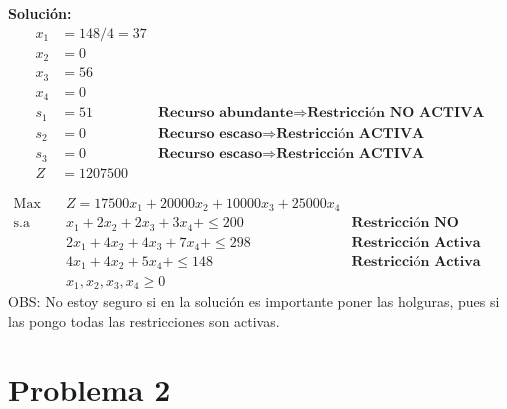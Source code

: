 \documentclass{templateNote}
\begin{document}
\begin{itemize}
    \textbf{Solución:}
    \begin{align*}
        x_1 &= 148/4 = 37 \\
        x_2 &= 0 \\
        x_3 &= 56 \\
        x_4 &= 0 \\
        s_1 &= 51 \qquad &\textbf{Recurso abundante} \Rightarrow \textbf{Restricci\'on NO ACTIVA} \\
        s_2 &= 0 \qquad &\textbf{Recurso escaso} \Rightarrow \textbf{Restricci\'on ACTIVA} \\
        s_3 &= 0 \qquad &\textbf{Recurso escaso} \Rightarrow \textbf{Restricci\'on ACTIVA} \\
        Z &= 1207500
    \end{align*}

    \begin{equation*}
        \begin{aligned}
            \text{Max} \quad & Z = 17500x_1 + 20000x_2 + 10000x_3 + 25000x_4 \\
            \text{s.a} \quad & x_1 + 2x_2 + 2x_3 + 3x_4 + \leq 200 \qquad &\textbf{Restricci\'on NO Activa} \\
            & 2x_1 + 4x_2 + 4x_3 + 7x_4 + \leq 298 \qquad &\textbf{Restricci\'on Activa} \\
            & 4x_1 + 4x_2 + 5x_4 + \leq 148 \qquad &\textbf{Restricci\'on Activa} \\
            & x_1, x_2, x_3, x_4 \geq 0
        \end{aligned}
    \end{equation*}
OBS: No estoy seguro si en la soluci\'on es importante poner las holguras, pues si las pongo todas las restricciones son activas.
\end{itemize}

\newpage
\section*{Problema 2}
\end{document}

